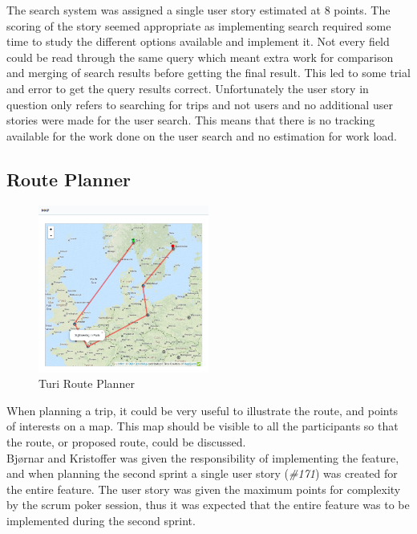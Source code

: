 \documentclass[a4paper]{article}
\begin{document}
\noindent
The search system was assigned a single user story estimated at 8 points. The scoring of the story seemed appropriate as implementing search required some time to study the different options available and implement it. Not every field could be read through the same query which meant extra work for comparison and merging of search results before getting the final result. This led to some trial and error to get the query results correct. Unfortunately the user story in question only refers to searching for trips and not users and no additional user stories were made for the user search. This means that there is no tracking available for the work done on the user search and no estimation for work load.


\subsection{Route Planner}

\begin{figure}[!h]
  \begin{center}
    \includegraphics[width=0.5\textwidth]{pictures/route_planning}
  \end{center}
\caption{Turi Route Planner}
\label{fig:route}
\end{figure}

\noindent
When planning a trip, it could be very useful to illustrate the route, and points of interests on a map. This map should be visible to all the participants so that the route, or proposed route, could be discussed.\\

\noindent
Bjørnar and Kristoffer was given the responsibility of implementing the feature, and when planning the second sprint a single user story (\emph{\#171}) was created for the entire feature. The user story was given the maximum points for complexity by the scrum poker session, thus it was expected that the entire feature was to be implemented during the second sprint. \\
\end{document}
